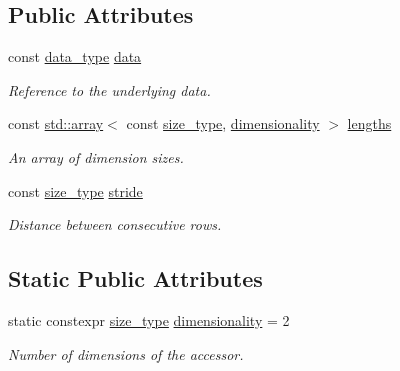 \subsection*{Public Attributes}
\begin{DoxyCompactItemize}
\item 
\mbox{\label{classgko_1_1accessor_1_1row__major_aa83eec10535e8ac7f79c6a04c0c05b4c}} 
const \hyperlink{classgko_1_1accessor_1_1row__major_a898459c9506607cd7df2b1f2728eac39}{data\+\_\+type} \hyperlink{classgko_1_1accessor_1_1row__major_aa83eec10535e8ac7f79c6a04c0c05b4c}{data}
\begin{DoxyCompactList}\small\item\em Reference to the underlying data. \end{DoxyCompactList}\item 
\mbox{\label{classgko_1_1accessor_1_1row__major_a4912695f06056d9e46cb335168bf28c9}} 
const \hyperlink{namespacegko_ae749a5ea11a93c1bcc9158d9a6e9fb68af1f713c9e000f5d3f280adbd124df4f5}{std\+::array}$<$ const \hyperlink{namespacegko_a6e5c95df0ae4e47aab2f604a22d98ee7}{size\+\_\+type}, \hyperlink{classgko_1_1accessor_1_1row__major_ae969fbac55f5ba6e6f95f25a0aac483d}{dimensionality} $>$ \hyperlink{classgko_1_1accessor_1_1row__major_a4912695f06056d9e46cb335168bf28c9}{lengths}
\begin{DoxyCompactList}\small\item\em An array of dimension sizes. \end{DoxyCompactList}\item 
\mbox{\label{classgko_1_1accessor_1_1row__major_a651793392dc0327f324289bb096b3316}} 
const \hyperlink{namespacegko_a6e5c95df0ae4e47aab2f604a22d98ee7}{size\+\_\+type} \hyperlink{classgko_1_1accessor_1_1row__major_a651793392dc0327f324289bb096b3316}{stride}
\begin{DoxyCompactList}\small\item\em Distance between consecutive rows. \end{DoxyCompactList}\end{DoxyCompactItemize}
\subsection*{Static Public Attributes}
\begin{DoxyCompactItemize}
\item 
\mbox{\label{classgko_1_1accessor_1_1row__major_ae969fbac55f5ba6e6f95f25a0aac483d}} 
static constexpr \hyperlink{namespacegko_a6e5c95df0ae4e47aab2f604a22d98ee7}{size\+\_\+type} \hyperlink{classgko_1_1accessor_1_1row__major_ae969fbac55f5ba6e6f95f25a0aac483d}{dimensionality} = 2
\begin{DoxyCompactList}\small\item\em Number of dimensions of the accessor. \end{DoxyCompactList}\end{DoxyCompactItemize}
